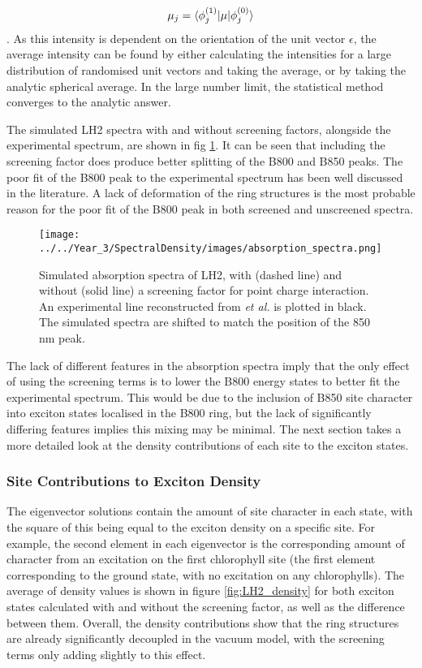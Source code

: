 \begin{equation}
    \mathbf{\mu}_j = \braket{\phi_j^{\left(1\right)}|\mathbf{\mu}|\phi_j^{\left(0\right)}}
\end{equation}
%
. As this intensity is dependent on the orientation of the unit vector $\epsilon$,
the average intensity can be found by either calculating the intensities for a large
distribution of randomised unit vectors and taking the average, or by taking the
analytic spherical average. In the large number limit, the statistical method converges
to the analytic answer.

The simulated LH2 spectra with and without screening factors, alongside the experimental 
spectrum, are shown in fig \ref{fig:LH2_abs_spec}. It can be seen that including
the screening factor does produce better splitting of the B800 and B850 peaks. The
poor fit of the B800 peak to the experimental spectrum has been well discussed in
the literature. A lack of deformation of the ring structures is the most probable
reason for the poor fit of the B800 peak in both screened and unscreened spectra.

\begin{figure}
    \centering
    \texttt{[image: ../../Year\_3/SpectralDensity/images/absorption\_spectra.png]}
    \label{fig:LH2_abs_spec}
    \caption{Simulated absorption spectra of LH2, with (dashed line) and without 
    (solid line) a screening factor for point charge interaction. An experimental
    line reconstructed from \emph{et al.} is plotted in black. The simulated spectra
    are shifted to match the position of the 850 nm peak.}
\end{figure}

The lack of different features in the absorption spectra imply that the only effect
of using the screening terms is to lower the B800 energy states to better fit the
experimental spectrum. This would be due to the inclusion of B850 site character
into exciton states localised in the B800 ring, but the lack of significantly differing
features implies this mixing may be minimal. The next section takes a more detailed
look at the density contributions of each site to the exciton states.

\subsubsection{Site Contributions to Exciton Density}
\label{subsubsec:site_dens}

The eigenvector solutions contain the amount of site character in each state, with
the square of this being equal to the exciton density on a specific site. For example,
the second element in each eigenvector is the corresponding amount of character 
from an excitation on the first chlorophyll site (the first element corresponding
to the ground state, with no excitation on any chlorophylls). The average of density
values is shown in figure \ref{fig:LH2_density} for both exciton states calculated
with and without the screening factor, as well as the difference between them. 
Overall, the density contributions show that the ring structures are already significantly
decoupled in the vacuum model, with the screening terms only adding slightly to 
this effect.

